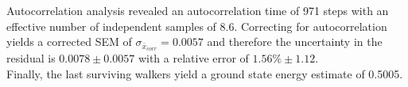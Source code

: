 \documentclass[reqno]{amsart}
\numberwithin{equation}{section}
\numberwithin{figure}{section}
\begin{document}
Autocorrelation analysis revealed an autocorrelation time of 971 steps with an effective number of independent samples of 8.6. Correcting for autocorrelation yields a corrected SEM of $\sigma_{\bar{x}_{corr}} = 0.0057$ and therefore the uncertainty in the residual is $0.0078 \pm 0.0057$ with a relative error of $1.56\% \pm 1.12$. \\

Finally, the last surviving walkers yield a ground state energy estimate of 0.5005. \\

\end{document}
